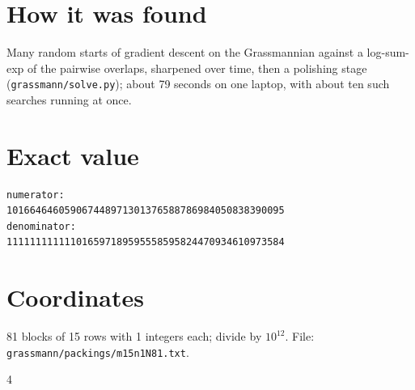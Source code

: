\documentclass[11pt,a4paper]{article}
\begin{document}
\section{How it was found}
Many random starts of gradient descent on the Grassmannian against a log-sum-exp of the pairwise overlaps, sharpened over time, then a polishing stage (\texttt{grassmann/solve.py}); about 79 seconds on one laptop, with about ten such searches running at once.


\appendix
\section{Exact value}
{\small
\begin{verbatim}
numerator:
101664646059067448971301376588786984050838390095
denominator:
111111111111016597189595558595824470934610973584
\end{verbatim}}

\section{Coordinates}
81 blocks of 15 rows with 1 integers each; divide by $10^{12}$. File: \texttt{grassmann/packings/m15n1N81.txt}.
{\tiny
\begin{multicols}{4}
\end{multicols}}
\end{document}
